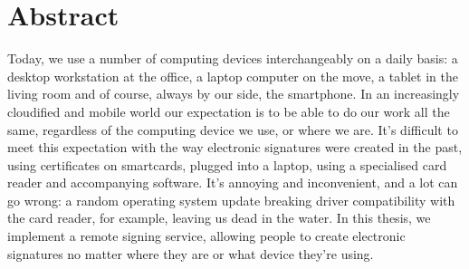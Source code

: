 \chapter*{Abstract}
\label{ch:abstract}


Today, we use a number of computing devices interchangeably on a daily basis: a desktop workstation at the office,
a laptop computer on the move, a tablet in the living room and of course, always by our side, the smartphone.
In an increasingly cloudified and mobile world our expectation is to be able to do our work all the same,
regardless of the computing device we use, or where we are.
It's difficult to meet this expectation with the way electronic signatures were created in the past,
using certificates on smartcards, plugged into a laptop, using a specialised card reader and accompanying software.
It's annoying and inconvenient, and a lot can go wrong:
a random operating system update breaking driver compatibility with the card reader, for example,
leaving us dead in the water.
In this thesis, we implement a remote signing service, allowing people to create electronic signatures no matter
where they are or what device they're using.

